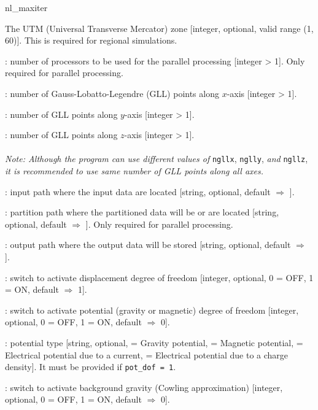 \begin{adescription}{nl\_maxiter}
  \item[utm\_zone]  The UTM (Universal Transverse Mercator) zone [integer, optional, valid range (1, 60)]. This is required for regional simulations.
  \item[nproc] : number of processors to be used for the parallel processing [integer > 1]. Only required for parallel processing.
  \item[ngllx] : number of Gauss-Lobatto-Legendre (GLL) points along $x$-axis [integer > 1].
  \item[nglly] : number of GLL points along $y$-axis [integer > 1].
  \item[ngllz] : number of GLL points along $z$-axis [integer > 1]. \\\\
  {\emph{Note: Although the program can use different values of}} \texttt{ngllx}, \texttt{nglly}, {\emph{and}} \texttt{ngllz}, {\emph{it is recommended to use same number of GLL points along all axes.}}
  \item[inp\_path]  : input path where the input data are located [string, optional, default $\Rightarrow$ \texttt{}].
  \item[part\_path] : partition path where the partitioned data will be or are located [string, optional, default $\Rightarrow$ \texttt{}]. Only required for parallel processing.
  \item[out\_path]  : output path where the output data will be stored [string, optional, default $\Rightarrow$ \texttt{}].
  \item[disp\_dof]  : switch to activate displacement degree of freedom [integer, optional, 0 = OFF, 1 = ON, default $\Rightarrow$ 1].
  \item[pot\_dof]  : switch to activate potential (gravity or magnetic) degree of freedom [integer, optional, 0 = OFF, 1 = ON, default $\Rightarrow$ 0].
  \item[pot\_type] : potential type [string, optional,\texttt{} = Gravity potential, \texttt{} = Magnetic potential, \texttt{} = Electrical potential due to a current, \texttt{} = Electrical potential due to a charge density]. It must be provided if \texttt{pot\_dof = 1}.
  \item[grav0]  : switch to activate background gravity (Cowling approximation) [integer, optional, 0 = OFF, 1 = ON, default $\Rightarrow$ 0].
  \\
\end{adescription}


